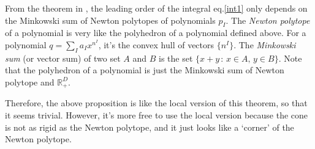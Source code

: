 \documentclass[12pt]{article}
\theoremstyle{definition}
\theoremstyle{plain}
\begin{document}
From the theorem in \cite{Arkani-Hamed:2019mrd}, the leading order of the integral eq.\eqref{int1} 
only depends on the Minkowski sum of Newton polytopes of polynomials $p_I$.
The \textit{Newton polytope} of a polynomial is very like the polyhedron of a polynomial defined above.
For a polynomial $q=\sum_I a_I x^{n^I}$, it's the convex hull of vectors $\{n^I\}$. The
\textit{Minkowski sum} (or vector sum) of two set $A$ and $B$ is the set $\{x+y\,:\,x\in A,\,y\in B\}$. 
Note that the polyhedron of a polynomial is just the Minkowski sum of Newton polytope and $\mathbb R_+^D$.

Therefore, the above proposition is like the local version of this theorem, so that 
it seems trivial. However, it's more free to use the local version because 
the cone is not as rigid as the Newton polytope, and it just looks  
like a `corner' of the Newton polytope.

\end{document}
